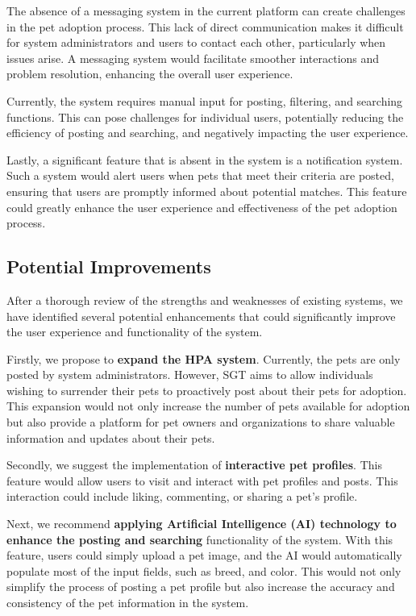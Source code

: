 The absence of a messaging system in the current platform can create challenges in the pet adoption process. This lack of direct communication makes it difficult for system administrators and users to contact each other, particularly when issues arise. A messaging system would facilitate smoother interactions and problem resolution, enhancing the overall user experience.

Currently, the system requires manual input for posting, filtering, and searching functions. This can pose challenges for individual users, potentially reducing the efficiency of posting and searching, and negatively impacting the user experience.

Lastly, a significant feature that is absent in the system is a notification system. Such a system would alert users when pets that meet their criteria are posted, ensuring that users are promptly informed about potential matches. This feature could greatly enhance the user experience and effectiveness of the pet adoption process.

\subsection{Potential Improvements}
After a thorough review of the strengths and weaknesses of existing systems, we have identified several potential enhancements that could significantly improve the user experience and functionality of the system.

Firstly, we propose to \textbf{expand the HPA system}. Currently, the pets are only posted by system administrators. However, SGT aims to allow individuals wishing to surrender their pets to proactively post about their pets for adoption. This expansion would not only increase the number of pets available for adoption but also provide a platform for pet owners and organizations to share valuable information and updates about their pets.

Secondly, we suggest the implementation of \textbf{interactive pet profiles}. This feature would allow users to visit and interact with pet profiles and posts. This interaction could include liking, commenting, or sharing a pet’s profile.

Next, we recommend \textbf{applying Artificial Intelligence (AI) technology to enhance the posting and searching} functionality of the system. With this feature, users could simply upload a pet image, and the AI would automatically populate most of the input fields, such as breed, and color. This would not only simplify the process of posting a pet profile but also increase the accuracy and consistency of the pet information in the system.

